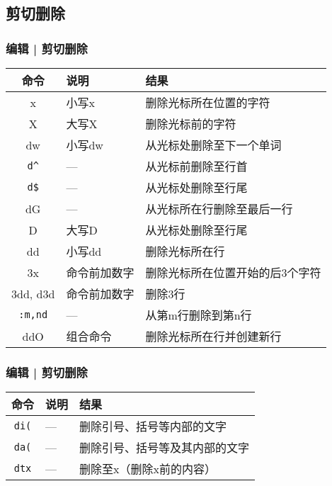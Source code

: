 \subsection{剪切删除}
\begin{frame}[fragile]
  \frametitle{编辑 | \alert{剪切删除}}
  \begin{table}
    \centering
    \begin{tabularx}{0.9\textwidth}{clX}
      \hline
      \rowcolor{blue!50}命令 & 说明 & 结果\\
      \hline
      x & 小写x & 删除光标所在位置的字符\\
      X & 大写X & 删除光标前的字符\\
      dw & 小写dw & 从光标处删除至下一个单词\\
      \verb|d^| & --- & 从光标前删除至行首\\
      \verb|d$| & --- & 从光标处删除至行尾\\
      dG & --- & 从光标所在行删除至最后一行\\
      D & 大写D & 从光标处删除至行尾\\
      dd & 小写dd & 删除光标所在行\\
      \hline
      3x & 命令前加数字 & 删除光标所在位置开始的后3个字符\\
      3dd, d3d & 命令前加数字 & 删除3行\\
      \verb|:m,nd| & --- & 从第m行删除到第n行\\
      \hline
      ddO & 组合命令 & 删除光标所在行并创建新行\\
      \hline
    \end{tabularx}
  \end{table}
\end{frame}

\begin{frame}[fragile]
  \frametitle{编辑 | \alert{剪切删除}}
  \begin{table}
    \centering
    \begin{tabularx}{0.8\textwidth}{clX}
      \hline
      \rowcolor{blue!50}命令 & 说明 & 结果\\
      \hline
      \verb|di(| & --- & 删除引号、括号等内部的文字\\
      \verb|da(| & --- & 删除引号、括号等及其内部的文字\\
      \verb|dtx| & --- & 删除至x（删除x前的内容）\\
      \hline
    \end{tabularx}
  \end{table}
\end{frame}

